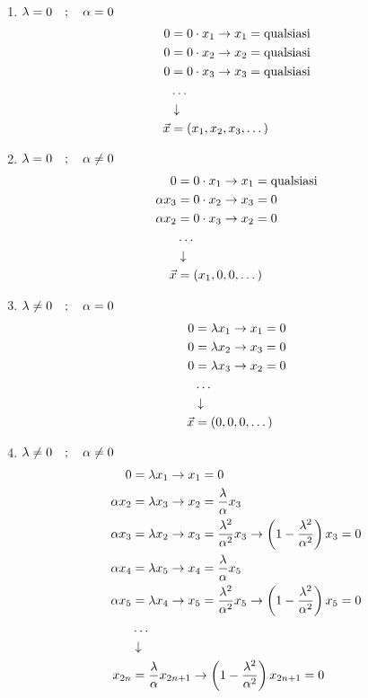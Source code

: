 \begin{enumerate}
	\item $\lambda = 0 \quad ; \quad \alpha =0$
	\begin{align}
		0 &= 0\cdot x_1 \to x_1 = \text{qualsiasi} \\
		0 &= 0\cdot x_2 \to x_2=\text{qualsiasi}\\
		0 &= 0\cdot x_3 \to x_3=\text{qualsiasi} \\
		&\dots \\ &\downarrow \nonumber \\
		\vec{x} &= (x_1,x_2, x_3, \dots)
	\end{align}
	\item $\lambda = 0 \quad ; \quad \alpha \neq 0$
	\begin{align}
		0 &= 0\cdot x_1 \to x_1 = \text{qualsiasi} \\
		\alpha x_3 &= 0\cdot x_2 \to x_3=0\\
		\alpha x_2 &= 0\cdot x_3 \to x_2=0 \\
		&\dots \\ &\downarrow \nonumber \\
		\vec{x} &= (x_1,0, 0, \dots)
	\end{align}
	\item $\lambda \neq 0 \quad ; \quad \alpha =0$
	\begin{align}
		0 &= \lambda x_1 \to x_1=0 \\
		0 &= \lambda x_2 \to x_3=0\\
		0 &= \lambda x_3 \to x_2=0 \\
		&\dots \\ &\downarrow \nonumber \\
		\vec{x} &= (0,0, 0, \dots)
	\end{align}
	\item $\lambda \neq 0 \quad ; \quad \alpha \neq 0$
	\begin{align}
		0 &= \lambda x_1 \to x_1=0 \\
		\alpha x_2 &= \lambda x_3 \to x_2=\frac{\lambda}{\alpha} x_3\\
		\alpha x_3 &= \lambda x_2 \to x_3=\frac{\lambda^2}{\alpha^2} x_3 \to \left(1 - \frac{\lambda^2}{\alpha^2}\right) x_3 = 0 \\
		\alpha x_4 &= \lambda x_5 \to x_4=\frac{\lambda}{\alpha} x_5\\
		\alpha x_5 &= \lambda x_4 \to x_5=\frac{\lambda^2}{\alpha^2} x_5 \to \left(1 - \frac{\lambda^2}{\alpha^2}\right) x_5 = 0\\
		&\dots \\ &\downarrow \nonumber \\
		x_{2n} &=\frac{\lambda}{\alpha} x_{2n+1} \to \left(1 - \frac{\lambda^2}{\alpha^2}\right) x_{2n+1} = 0 
	\end{align}
	

\end{enumerate}
